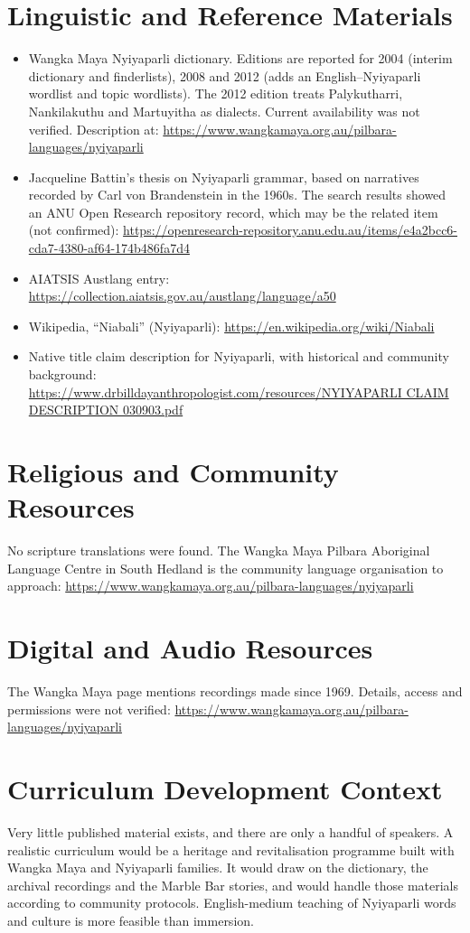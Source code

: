 \documentclass[12pt]{article}
\begin{document}
\section{Linguistic and Reference Materials}
\begin{itemize}
\item Wangka Maya Nyiyaparli dictionary. Editions are reported for 2004 (interim dictionary and finderlists), 2008 and 2012 (adds an English--Nyiyaparli wordlist and topic wordlists). The 2012 edition treats Palykutharri, Nankilakuthu and Martuyitha as dialects. Current availability was not verified. Description at: \url{https://www.wangkamaya.org.au/pilbara-languages/nyiyaparli}
\item Jacqueline Battin's thesis on Nyiyaparli grammar, based on narratives recorded by Carl von Brandenstein in the 1960s. The search results showed an ANU Open Research repository record, which may be the related item (not confirmed): \url{https://openresearch-repository.anu.edu.au/items/e4a2bcc6-cda7-4380-af64-174b486fa7d4}
\item AIATSIS Austlang entry: \url{https://collection.aiatsis.gov.au/austlang/language/a50}
\item Wikipedia, ``Niabali'' (Nyiyaparli): \url{https://en.wikipedia.org/wiki/Niabali}
\item Native title claim description for Nyiyaparli, with historical and community background: \url{https://www.drbilldayanthropologist.com/resources/NYIYAPARLI CLAIM DESCRIPTION 030903.pdf}
\end{itemize}

\section{Religious and Community Resources}
No scripture translations were found. The Wangka Maya Pilbara Aboriginal Language Centre in South Hedland is the community language organisation to approach: \url{https://www.wangkamaya.org.au/pilbara-languages/nyiyaparli}

\section{Digital and Audio Resources}
The Wangka Maya page mentions recordings made since 1969. Details, access and permissions were not verified: \url{https://www.wangkamaya.org.au/pilbara-languages/nyiyaparli}

\section{Curriculum Development Context}
Very little published material exists, and there are only a handful of speakers. A realistic curriculum would be a heritage and revitalisation programme built with Wangka Maya and Nyiyaparli families. It would draw on the dictionary, the archival recordings and the Marble Bar stories, and would handle those materials according to community protocols. English-medium teaching of Nyiyaparli words and culture is more feasible than immersion.
\end{document}
